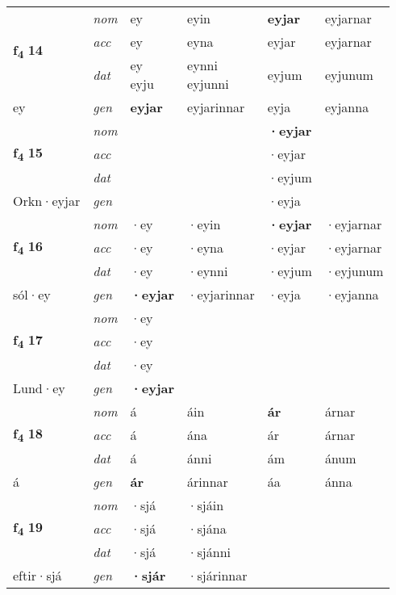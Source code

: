 \begin{longtable}[l]{X>{\footnotesize\itshape}XXXXX}
\multirow{3}{*}{{{\textbf{f{\textsubscript{4}}} \Large{\textbf{14}}}}} & nom & ey & eyin & \textbf{eyjar} & eyjarnar \\*
 & acc & ey & eyna & eyjar & eyjarnar \\*
 & dat & \specialcell{ey\\ eyju} & \specialcell{eynni\\ eyjunni} & eyjum & eyjunum \\*
 {\footnotesize{ey}} & gen & \textbf{eyjar} & eyjarinnar & eyja & eyjanna \\
\cmidrule{1-6}

\multirow{3}{*}{{{\textbf{f{\textsubscript{4}}} \Large{\textbf{15}}}}} & nom &  &  & \textbf{·eyjar} &  \\*
 & acc &  &  & ·eyjar &  \\*
 & dat &  &  & ·eyjum &  \\*
 {\footnotesize{Orkn\allowbreak ·eyjar}} & gen & \textbf{} &  & ·eyja &  \\
\cmidrule{1-6}

\multirow{3}{*}{{{\textbf{f{\textsubscript{4}}} \Large{\textbf{16}}}}} & nom & ·ey & ·eyin & \textbf{·eyjar} & ·eyjarnar \\*
 & acc & ·ey & ·eyna & ·eyjar & ·eyjarnar \\*
 & dat & ·ey & ·eynni & ·eyjum & ·eyjunum \\*
 {\footnotesize{sól\allowbreak ·ey}} & gen & \textbf{·eyjar} & ·eyjarinnar & ·eyja & ·eyjanna \\
\cmidrule{1-6}

\multirow{3}{*}{{{\textbf{f{\textsubscript{4}}} \Large{\textbf{17}}}}} & nom & ·ey &  & \textbf{} &  \\*
 & acc & ·ey &  &  &  \\*
 & dat & ·ey &  &  &  \\*
 {\footnotesize{Lund\allowbreak ·ey}} & gen & \textbf{·eyjar} &  &  &  \\
\cmidrule{1-6}

\multirow{3}{*}{{{\textbf{f{\textsubscript{4}}} \Large{\textbf{18}}}}} & nom & á & áin & \textbf{ár} & árnar \\*
 & acc & á & ána & ár & árnar \\*
 & dat & á & ánni & ám & ánum \\*
 {\footnotesize{á}} & gen & \textbf{ár} & árinnar & áa & ánna \\
\cmidrule{1-6}

\multirow{3}{*}{{{\textbf{f{\textsubscript{4}}} \Large{\textbf{19}}}}} & nom & ·sjá & ·sjáin & \textbf{} &  \\*
 & acc & ·sjá & ·sjána &  &  \\*
 & dat & ·sjá & ·sjánni &  &  \\*
 {\footnotesize{eftir\allowbreak ·sjá}} & gen & \textbf{·sjár} & ·sjárinnar &  &  \\
\cmidrule{1-6}


\end{longtable}

